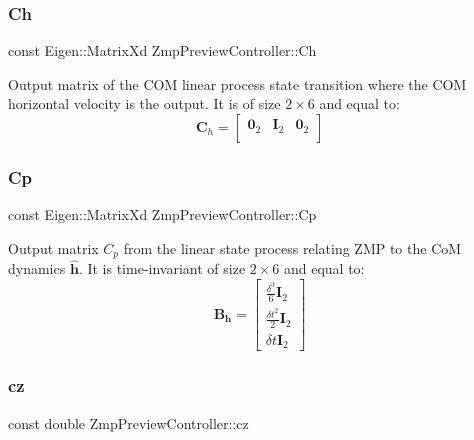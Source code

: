 \subsubsection{\texorpdfstring{Ch}{Ch}}
{\footnotesize\ttfamily const Eigen\+::\+Matrix\+Xd Zmp\+Preview\+Controller\+::\+Ch\hspace{0.3cm}{\ttfamily [private]}}

Output matrix of the C\+OM linear process state transition where the C\+OM horizontal velocity is the output. It is of size $2\times6$ and equal to\+: \[ \mathbf{C}_h = \left[\begin{array}{ccc} \mathbf{0}_2 & \mathbf{I}_2 & \mathbf{0}_2 \\ \end{array}\right] \] \hypertarget{classZmpPreviewController_a1a63870dcc3d51a26c4adc9c97e650ff}{}\label{classZmpPreviewController_a1a63870dcc3d51a26c4adc9c97e650ff} 
\subsubsection{\texorpdfstring{Cp}{Cp}}
{\footnotesize\ttfamily const Eigen\+::\+Matrix\+Xd Zmp\+Preview\+Controller\+::\+Cp\hspace{0.3cm}{\ttfamily [private]}}

Output matrix $C_p$ from the linear state process relating Z\+MP to the CoM dynamics $\hat{\mathbf{h}}$. It is time-\/invariant of size $2\times6$ and equal to\+: \[ \mathbf{B_h} = \left[ \begin{array}{c} \frac{\delta^3}{6}\mathbf{I}_2 \\ \frac{\delta t^2}{2} \mathbf{I}_2 \\ \delta t \mathbf{I}_2 \end{array} \right] \] \hypertarget{classZmpPreviewController_a3a317d26cc1bbaf8811491724fdd1def}{}\label{classZmpPreviewController_a3a317d26cc1bbaf8811491724fdd1def} 
\subsubsection{\texorpdfstring{cz}{cz}}
{\footnotesize\ttfamily const double Zmp\+Preview\+Controller\+::cz\hspace{0.3cm}{\ttfamily [private]}}

